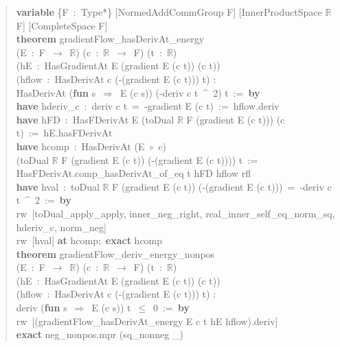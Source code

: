 \documentclass[symmetry,article,submit,moreauthors]{Definitions/mdpi}
\begin{document}
\begin{quote}\small\ttfamily\raggedright
\textbf{variable} \{F~:~Type*\} [NormedAddCommGroup F] [InnerProductSpace $\mathbb{R}$ F] [CompleteSpace F]\\[6pt]
\textbf{theorem} gradientFlow\_hasDerivAt\_energy\\
\phantom{xx}(E~:~F~$\to$~$\mathbb{R}$) (c~:~$\mathbb{R}$~$\to$~F) (t~:~$\mathbb{R}$)\\
\phantom{xx}(hE~:~HasGradientAt E (gradient E (c t)) (c t))\\
\phantom{xx}(hflow~:~HasDerivAt c (-(gradient E (c t))) t) :\\
\phantom{xx}HasDerivAt (\textbf{fun} s~$\Rightarrow$~E (c s)) (-\textbar\textbar deriv c t\textbar\textbar~\^{}~2) t~:=~\textbf{by}\\
\phantom{xx}\textbf{have} hderiv\_c~:~deriv c t~=~-gradient E (c t)~:=~hflow.deriv\\
\phantom{xx}\textbf{have} hFD~:~HasFDerivAt E (toDual $\mathbb{R}$ F (gradient E (c t))) (c t)~:=~hE.hasFDerivAt\\
\phantom{xx}\textbf{have} hcomp~:~HasDerivAt (E~$\circ$~c)\\
\phantom{xxxx}(toDual $\mathbb{R}$ F (gradient E (c t)) (-(gradient E (c t)))) t~:=\\
\phantom{xxxx}HasFDerivAt.comp\_hasDerivAt\_of\_eq t hFD hflow rfl\\
\phantom{xx}\textbf{have} hval~:~toDual $\mathbb{R}$ F (gradient E (c t)) (-(gradient E (c t)))~=~-\textbar\textbar deriv c t\textbar\textbar~\^{}~2~:=~\textbf{by}\\
\phantom{xxxx}rw~[toDual\_apply\_apply, inner\_neg\_right, real\_inner\_self\_eq\_norm\_sq, hderiv\_c, norm\_neg]\\
\phantom{xx}rw~[hval] \textbf{at} hcomp;~\textbf{exact} hcomp\\[6pt]
\textbf{theorem} gradientFlow\_deriv\_energy\_nonpos\\
\phantom{xx}(E~:~F~$\to$~$\mathbb{R}$) (c~:~$\mathbb{R}$~$\to$~F) (t~:~$\mathbb{R}$)\\
\phantom{xx}(hE~:~HasGradientAt E (gradient E (c t)) (c t))\\
\phantom{xx}(hflow~:~HasDerivAt c (-(gradient E (c t))) t) :\\
\phantom{xx}deriv (\textbf{fun} s~$\Rightarrow$~E (c s)) t~$\le$~0~:=~\textbf{by}\\
\phantom{xx}rw~[(gradientFlow\_hasDerivAt\_energy E c t hE hflow).deriv]\\
\phantom{xx}\textbf{exact} neg\_nonpos.mpr (sq\_nonneg \_)
\end{quote}
\end{document}
